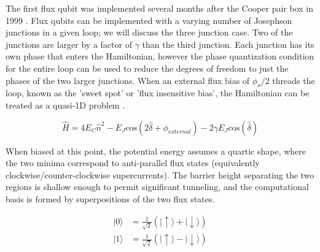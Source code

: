 \documentclass[%
 reprint,
showpacs,
 amsmath,amssymb,
 aps,
longbibliography,
]{revtex4-1}
\begin{document}
The first flux qubit was implemented several months after the Cooper pair box in 1999 \cite{fluxqubit}. Flux qubits can be implemented with a varying number of Josephson junctions in a given loop; we will discuss the three junction case. Two of the junctions are larger by a factor of $\gamma$ than the third junction. Each junction has its own phase that enters the Hamiltonian, however the phase quantization condition for the entire loop can be used to reduce the degrees of freedom to just the phases of the two larger junctions. When an external flux bias of $\phi_o /2$ threads the loop, known as the 'sweet spot' or 'flux insensitive bias', the Hamiltonian can be treated as a quasi-1D problem \cite{scqb_intro}.

\begin{equation*}
\hat{H} = 4E_C \hat{n}^2 - E_J \textrm{cos}(2\hat{\delta} + \phi_{external}) - 2\gamma E_J\textrm{cos}(\hat{\delta})
\end{equation*}

When biased at this point, the potential energy assumes a quartic shape, where the two minima correspond to anti-parallel flux states (equivalently clockwise/counter-clockwise supercurrents). The barrier height separating the two regions is shallow enough to permit significant tunneling, and the computational basis is formed by superpositions of the two flux states.

\begin{align*}
|0\rangle &= \frac{1}{\sqrt{2}}\left(|\uparrow\rangle +  |\downarrow\rangle\right) \\
|1\rangle &= \frac{1}{\sqrt{2}}\left(|\uparrow\rangle -  |\downarrow\rangle\right)
\end{align*}
\end{document}
